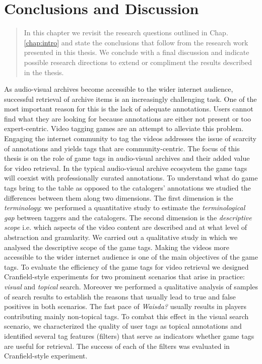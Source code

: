 \chapter{Conclusions and Discussion}\label{chap:conclusion}
\begin{quotation}
\noindent 
In this chapter we revisit the research questions outlined in Chap. \ref{chap:intro} and state the conclusions that follow from the research work presented in this thesis. We conclude with a final discussion and indicate possible research directions to extend or compliment the results described in the thesis.  
\end{quotation}

As audio-visual archives become accessible to the wider internet audience, successful retrieval of archive items is an increasingly challenging task. One of the most important reason for this is the lack of adequate annotations. Users cannot find what they are looking for because annotations are either not
present or too expert-centric. Video tagging games are an attempt to alleviate this problem. Engaging the internet community to tag the videos addresses the issue of scarcity of annotations and yields tags that are community-centric. The focus of this thesis is on the role of game tags in audio-visual archives and their added value for video retrieval. In the typical audio-visual archive ecosystem the game tags will coexist with professionally curated annotations. To understand what do game tags bring to the table as opposed to the catalogers' annotations we studied the differences between them along two dimensions. The first dimension is the \textit{terminology}: we performed a quantitative study to estimate the \textit{terminological gap} between taggers and the catalogers. The second dimension is the \textit{descriptive scope} i.e. which aspects of the video content are described and at what level of abstraction and granularity. We carried out a qualitative study in which we analysed the descriptive scope of the game tags. Making the videos more accessible to the wider internet audience is one of the main objectives of the game tags. To evaluate the efficiency of the game tags for video retrieval we designed Cranfield-style experiments for two prominent scenarios that arise in practice: \textit{visual} and \textit{topical} search. Moreover we performed a qualitative analysis of samples of search results to establish the reasons that usually lead to true and false positives in both scenarios. The fast pace of \textit{Waisda?} usually results in players contributing mainly non-topical tags. To combat this effect in the visual search scenario, we characterized the quality of user tags as topical annotations and identified several tag features (filters) that serve as indicators whether game tags are useful for retrieval. The success of each of the filters was evaluated in Cranfield-style experiment.

